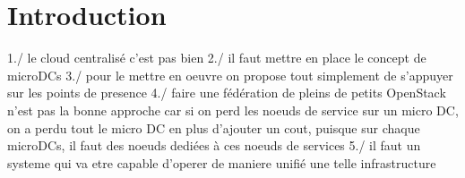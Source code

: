 \section{Introduction}
\label{sec:intro} 
1./ le cloud centralisé c'est pas bien 
2./ il faut mettre en place le concept de microDCs
3./ pour le mettre en oeuvre on propose tout simplement de s'appuyer sur les points de presence
4./ faire une fédération de pleins de petits OpenStack n'est pas la bonne approche car si on perd les noeuds de service sur un micro DC, on a perdu tout le micro DC en plus d'ajouter un cout, puisque sur chaque microDCs, il faut des noeuds dediées à ces noeuds de services
5./ il faut un systeme qui va etre capable d'operer de maniere unifié une telle infrastructure

